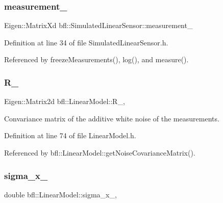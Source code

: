 \subsubsection{\texorpdfstring{measurement\+\_\+}{measurement\_}}
{\footnotesize\ttfamily Eigen\+::\+Matrix\+Xd bfl\+::\+Simulated\+Linear\+Sensor\+::measurement\+\_\+\hspace{0.3cm}{\ttfamily [protected]}}



Definition at line 34 of file Simulated\+Linear\+Sensor.\+h.



Referenced by freeze\+Measurements(), log(), and measure().

\mbox{\label{classbfl_1_1LinearModel_afafae44b71487e16b19311f773a19db8}} 
\subsubsection{\texorpdfstring{R\+\_\+}{R\_}}
{\footnotesize\ttfamily Eigen\+::\+Matrix2d bfl\+::\+Linear\+Model\+::\+R\+\_\+\hspace{0.3cm}{\ttfamily [protected]}, {\ttfamily [inherited]}}



Convariance matrix of the additive white noise of the measurements. 



Definition at line 74 of file Linear\+Model.\+h.



Referenced by bfl\+::\+Linear\+Model\+::get\+Noise\+Covariance\+Matrix().

\mbox{\label{classbfl_1_1LinearModel_af6f8cd224c5e6e434dbba28032e8ecdd}} 
\subsubsection{\texorpdfstring{sigma\+\_\+x\+\_\+}{sigma\_x\_}}
{\footnotesize\ttfamily double bfl\+::\+Linear\+Model\+::sigma\+\_\+x\+\_\+\hspace{0.3cm}{\ttfamily [protected]}, {\ttfamily [inherited]}}



